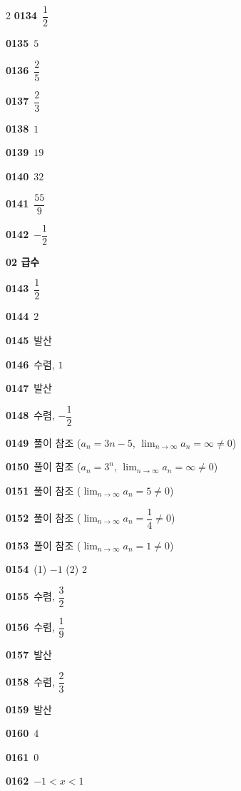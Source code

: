 \documentclass[10pt,a4paper]{article}
\begin{document}
\begin{multicols}{2}
\noindent\textbf{0134}\ $\dfrac{1}{2}$\par
\noindent\textbf{0135}\ $5$\par
\noindent\textbf{0136}\ $\dfrac{2}{5}$\par
\noindent\textbf{0137}\ $\dfrac{2}{3}$\par
\noindent\textbf{0138}\ $1$\par
\noindent\textbf{0139}\ $19$\par
\noindent\textbf{0140}\ $32$\par
\noindent\textbf{0141}\ $\dfrac{55}{9}$\par
\noindent\textbf{0142}\ $-\dfrac{1}{2}$\par
\noindent\textbf{02 급수}\par\smallskip
\noindent\textbf{0143}\ $\dfrac{1}{2}$\par
\noindent\textbf{0144}\ $2$\par
\noindent\textbf{0145}\ 발산\par
\noindent\textbf{0146}\ 수렴, $1$\par
\noindent\textbf{0147}\ 발산\par
\noindent\textbf{0148}\ 수렴, $-\dfrac{1}{2}$\par
\noindent\textbf{0149}\ 풀이 참조 ($a_n=3n-5$, $\displaystyle\lim_{n\to\infty} a_n=\infty\ne 0$)\par
\noindent\textbf{0150}\ 풀이 참조 ($a_n=3^n$, $\displaystyle\lim_{n\to\infty} a_n=\infty\ne 0$)\par
\noindent\textbf{0151}\ 풀이 참조 ($\displaystyle\lim_{n\to\infty} a_n=5\ne 0$)\par
\noindent\textbf{0152}\ 풀이 참조 ($\displaystyle\lim_{n\to\infty} a_n=\dfrac{1}{4}\ne 0$)\par
\noindent\textbf{0153}\ 풀이 참조 ($\displaystyle\lim_{n\to\infty} a_n=1\ne 0$)\par
\noindent\textbf{0154}\ (1) $-1$ \quad (2) $2$\par
\noindent\textbf{0155}\ 수렴, $\dfrac{3}{2}$\par
\noindent\textbf{0156}\ 수렴, $\dfrac{1}{9}$\par
\noindent\textbf{0157}\ 발산\par
\noindent\textbf{0158}\ 수렴, $\dfrac{2}{3}$\par
\noindent\textbf{0159}\ 발산\par
\noindent\textbf{0160}\ $4$\par
\noindent\textbf{0161}\ $0$\par
\noindent\textbf{0162}\ $-1<x<1$\par

\end{multicols}
\end{document}
